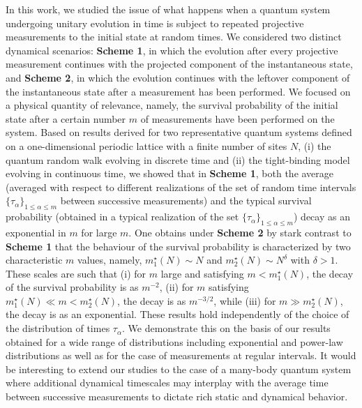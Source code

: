 \documentclass[12pt]{iopart}
\begin{document}
In this work, we studied the issue of what happens when a quantum system
undergoing unitary evolution in time is subject to repeated projective measurements to the initial state at
random times. We considered two distinct dynamical scenarios: {\bf
Scheme 1}, in
which the evolution after every projective measurement continues with the
projected component of the instantaneous state, and {\bf Scheme 2}, in which the evolution continues with the
leftover component of the instantaneous state after a 
measurement has been performed.
We focused on a physical quantity of relevance, namely, the survival
probability of the initial state after a certain number $m$ of
measurements have been performed on the system.  Based on results derived
for two representative quantum systems defined on a one-dimensional periodic lattice with a finite number of sites $N$,  (i) the quantum random walk evolving in discrete time
and (ii) the tight-binding model evolving in continuous time, we showed that in {\bf Scheme 1}, both
the average (averaged with respect to different realizations of the set
of random time intervals $\{\tau_\alpha\}_{1\le \alpha \le m}$ between successive
measurements) and the typical survival probability (obtained in a typical
realization of the set $\{\tau_\alpha\}_{1\le \alpha \le m}$) decay as an
exponential in $m$ for large $m$.  One obtains under {\bf Scheme 2} by stark contrast to {\bf Scheme 1} that the behaviour of the survival probability is characterized by two characteristic $m$ values, namely, $m_1^\star(N) \sim N$ and $m_2^\star(N) \sim N^\delta$ with $\delta >1$. These scales are such that (i) for $m$ large and satisfying $m < m_1^\star(N)$, the decay of the survival probability is as $m^{-2}$,  (ii) for $m$ satisfying $m_1^\star(N) \ll m <m_2^\star(N)$, the decay is as $m^{-3/2
        }$,  while (iii) for $m \gg m_2^\star(N)$, the decay is as an exponential.  These results
hold independently of the choice of the distribution of times $\tau_\alpha$. We demonstrate this on the basis of our results obtained for a wide range of distributions including exponential and power-law distributions as well as for the case of measurements at regular intervals.  It would be
interesting to extend our studies to the case of
a many-body quantum system where additional dynamical timescales may
interplay with the average time between successive measurements to
dictate rich static and dynamical behavior. 

\end{document}
